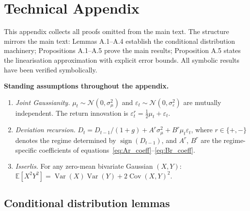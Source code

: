 \documentclass[12pt,a4paper]{article}
\theoremstyle{definition}
\begin{document}
\section{Technical Appendix}
\label{app:proofs}

This appendix collects all proofs omitted from the main text. The
structure mirrors the main text: Lemmas A.1--A.4 establish the
conditional distribution machinery; Propositions A.1--A.5 prove
the main results; Proposition A.5 states the linearisation
approximation with explicit error bounds. All symbolic results
have been verified symbolically.

\medskip
\noindent\textbf{Standing assumptions throughout the appendix.}
\begin{enumerate}
  \item[(A1)] \textit{Joint Gaussianity.} $\mu_t \sim \mathcal{N}(0,
    \sigma^2_\mu)$ and $\varepsilon_t \sim \mathcal{N}(0,
    \sigma^2_\varepsilon)$ are mutually independent. The return
    innovation is $\varepsilon^r_t = \frac{1}{2}\mu_t +
    \varepsilon_t$.
  \item[(A2)] \textit{Deviation recursion.} $D_t = D_{t-1}/(1+g) +
    A^r\sigma^2_\mu + B^r\mu_t\varepsilon_t$, where $r \in \{+,-\}$
    denotes the regime determined by $\operatorname{sign}(D_{t-1})$,
    and $A^r$, $B^r$ are the regime-specific coefficients of
    equations~\eqref{eq:Ar_coeff}--\eqref{eq:Br_coeff}.
  \item[(A3)] \textit{Isserlis.} For any zero-mean bivariate Gaussian
    $(X,Y)$: $\mathbb{E}[X^2Y^2] = \operatorname{Var}(X)
    \operatorname{Var}(Y) + 2\operatorname{Cov}(X,Y)^2$.
\end{enumerate}

\subsection{Conditional distribution lemmas}
\end{document}
